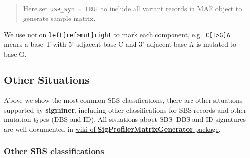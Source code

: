 \documentclass[
  12pt,
  a4paper,
  twoside]{book}
\newenvironment{Shaded}{\begin{snugshade}}{\end{snugshade}}
\newcommand{\DecValTok}[1]{\textcolor[rgb]{0.00,0.00,0.81}{#1}}
\newcommand{\DocumentationTok}[1]{\textcolor[rgb]{0.56,0.35,0.01}{\textbf{\textit{#1}}}}
\newcommand{\NormalTok}[1]{#1}
\newcommand{\SpecialCharTok}[1]{\textcolor[rgb]{0.00,0.00,0.00}{#1}}
\begin{document}
\begin{quote}
Here set \texttt{use\_syn\ =\ TRUE} to include all variant records in MAF object to generate sample matrix.
\end{quote}

\begin{Shaded}
\end{Shaded}

We use notion \texttt{left{[}ref\textgreater{}mut{]}right} to mark each component, e.g.~\texttt{C{[}T\textgreater{}G{]}A} means a base T with 5' adjacent base C and 3' adjacent base A is mutated to base G.

\hypertarget{other-situations}{%
\subsection{Other Situations}\label{other-situations}}

Above we show the most common SBS classifications, there are other situations supported by \textbf{sigminer}, including other classifications for SBS records and other mutation types (DBS and ID). All situations about SBS, DBS and ID signatures are well documented in \href{https://osf.io/s93d5/wiki/home/}{wiki of \textbf{SigProfilerMatrixGenerator} package}.

\hypertarget{other-sbs-classifications}{%
\subsubsection{Other SBS classifications}\label{other-sbs-classifications}}
\end{document}
